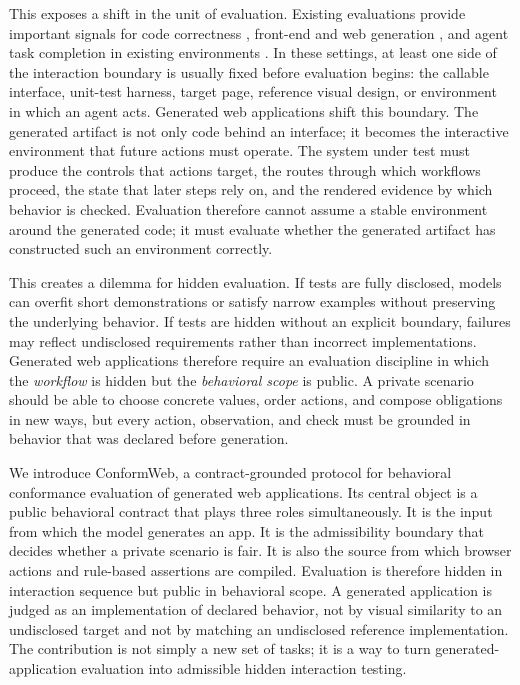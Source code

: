 This exposes a shift in the unit of evaluation. Existing evaluations provide
important signals for code correctness
\citep{jimenez2024swebench,jain2024livecodebench,zhuo2024bigcodebench},
front-end and web generation
\citep{si2024design2code,lu2025webgenbench,zhu2025frontendbench,11334714}, and
agent task completion in existing environments
\citep{zhou2024webarena,koh2024visualwebarena,drouin2024workarena,xie2024osworld}.
In these settings, at least one side of the interaction boundary is usually
fixed before evaluation begins: the callable interface, unit-test harness,
target page, reference visual design, or environment in which an agent acts.
Generated web applications shift this boundary. The generated artifact is not
only code behind an interface; it becomes the interactive environment that
future actions must operate. The system under test must produce the controls
that actions target, the routes through which workflows proceed, the state that
later steps rely on, and the rendered evidence by which behavior is checked.
Evaluation therefore cannot assume a stable environment around the generated
code; it must evaluate whether the generated artifact has constructed such an
environment correctly.

This creates a dilemma for hidden evaluation. If tests are fully disclosed,
models can overfit short demonstrations or satisfy narrow examples without
preserving the underlying behavior. If tests are hidden without an explicit
boundary, failures may reflect undisclosed requirements rather than incorrect
implementations. Generated web applications therefore require an evaluation
discipline in which the \emph{workflow} is hidden but the \emph{behavioral
scope} is public. A private scenario should be able to choose concrete values,
order actions, and compose obligations in new ways, but every action,
observation, and check must be grounded in behavior that was declared before
generation.

We introduce ConformWeb, a contract-grounded protocol for behavioral
conformance evaluation of generated web applications. Its central object is a
public behavioral contract that plays three roles simultaneously. It is the
input from which the model generates an app. It is the admissibility boundary
that decides whether a private scenario is fair. It is also the source from
which browser actions and rule-based assertions are compiled. Evaluation is
therefore hidden in interaction sequence but public in behavioral scope. A
generated application is judged as an implementation of declared behavior, not
by visual similarity to an undisclosed target and not by matching an
undisclosed reference implementation. The contribution is not simply a new set
of tasks; it is a way to turn generated-application evaluation into admissible
hidden interaction testing.

